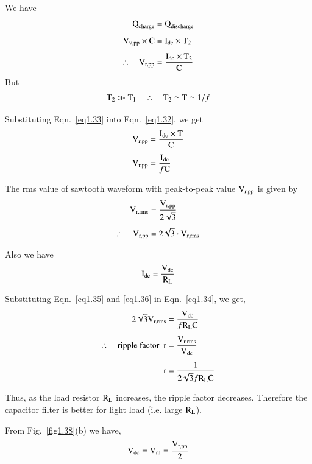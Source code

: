 We have
\begin{align}
\textrm{Q}_{\text{charge}} &= \textrm{Q}_{\text{discharge}}\notag\\[4pt]
\textrm{V}_{\textrm{v},\text{pp}}\times \textrm{C} &= \textrm{I}_{\text{dc}}\times \textrm{T}_{2}\notag\\[4pt]
\therefore\quad \textrm{V}_{\text{r,pp}} &= \frac{\textrm{I}_{\text{dc}}\times \textrm{T}_{2}}{\textrm{C}}\label{eq1.32}
\end{align}
But
\begin{equation}
\textrm{T}_{2}\gg \textrm{T}_{1}\quad\therefore\quad \textrm{T}_{2}\simeq \textrm{T}\simeq 1/f\label{eq1.33}
\end{equation}

Substituting Eqn.~\eqref{eq1.33} into Eqn.~\eqref{eq1.32}, we get
\begin{align}
\textrm{V}_{\text{r,pp}} &= \frac{\textrm{I}_{\text{dc}}\times \textrm{T}}{\textrm{C}}\notag\\[4pt]
\textrm{V}_{\text{r,pp}} &= \frac{\textrm{I}_{\text{dc}}}{f\textrm{C}}\label{eq1.34}
\end{align}

The rms value of sawtooth waveform with peak-to-peak value $\textrm{V}_{\text{r,pp}}$ is given by
\begin{align}
\textrm{V}_{\text{r,rms}} &= \frac{\textrm{V}_{\text{r,pp}}}{2\sqrt{3}}\notag\\[4pt]
\therefore\quad \textrm{V}_{\text{r,pp}} &= 2\sqrt{3}\cdot \textrm{V}_{\text{r,rms}}\label{eq1.35}
\end{align}

Also we have
\begin{equation}
\textrm{I}_{\text{dc}}=\frac{\textrm{V}_{\text{dc}}}{\textrm{R}_{\textrm{L}}}\label{eq1.36}
\end{equation}

Substituting Eqn.~\eqref{eq1.35} and \eqref{eq1.36} in Eqn.~\eqref{eq1.34}, we get,
\begin{align}
2\sqrt{3}\textrm{V}_{\text{r,rms}} &= \frac{\textrm{V}_{\text{dc}}}{f\textrm{R}_{\textrm{L}}\textrm{C}}\notag\\[4pt]
\therefore\quad \text{ripple factor~ } \textrm{r} &= \frac{\textrm{V}_{\text{r,rms}}}{\textrm{V}_{\text{dc}}}\notag\\[4pt]
\textrm{r} &= \frac{1}{2\sqrt{3}f\textrm{R}_{\textrm{L}}\textrm{C}}\label{eq1.37}
\end{align}

Thus, as the load resistor $\textrm{R}_{\textrm{L}}$ increases, the ripple factor decreases. Therefore the capacitor filter is better for light load (i.e. large $\textrm{R}_{\textrm{L}}$).

From Fig.~\ref{fig1.38}(b) we have,
\begin{equation}
\textrm{V}_{\text{dc}}=\textrm{V}_{\textrm{m}}=\dfrac{\textrm{V}_{\text{r,pp}}}{2}\label{eq1.38}
\end{equation}

